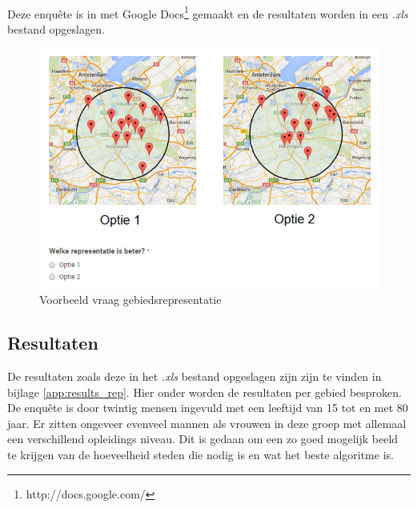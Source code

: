 \documentclass[twoside,openright]{uva-bachelor-thesis}
\begin{document}
			\\[0.5cm]
			Deze enqu\^ete is in met Google Docs\footnote{http://docs.google.com/} gemaakt en de resultaten worden in een \textit{.xls} bestand opgeslagen.
			\begin{figure}[!htb]
				\centering
				\includegraphics[scale=0.8]{./img/algo.png}
				\caption{Voorbeeld vraag gebiedsrepresentatie}
				\label{fig:algo}
			\end{figure}	
		\newpage		
		\subsection{Resultaten}
			De resultaten zoals deze in het \textit{.xls} bestand opgeslagen zijn zijn te vinden in bijlage \ref{app:results_rep}. Hier onder worden de resultaten per gebied besproken. De enqu\^ete is door twintig mensen ingevuld met een leeftijd van 15 tot en met 80 jaar. Er zitten ongeveer evenveel mannen als vrouwen in deze groep met allemaal een verschillend opleidings niveau. Dit is gedaan om een zo goed mogelijk beeld te krijgen van de hoeveelheid steden die nodig is en wat het beste algoritme is.
\end{document}
